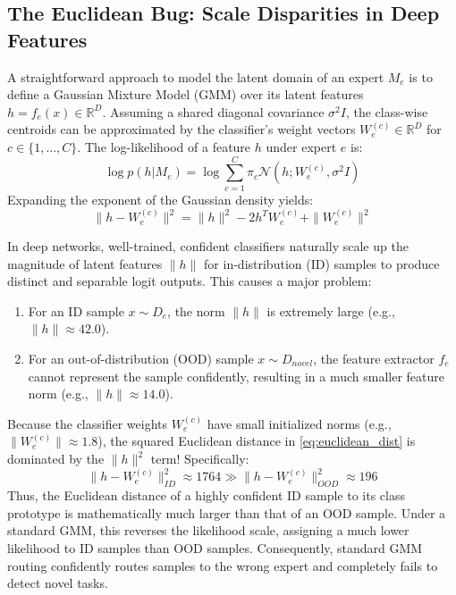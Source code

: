 \documentclass{article}
\theoremstyle{plain}
\theoremstyle{definition}
\theoremstyle{remark}
\begin{document}
\subsection{The Euclidean Bug: Scale Disparities in Deep Features}
\label{sec:bug}

A straightforward approach to model the latent domain of an expert $M_e$ is to define a Gaussian Mixture Model (GMM) over its latent features $h = f_e(x) \in \mathbb{R}^D$. Assuming a shared diagonal covariance $\sigma^2 I$, the class-wise centroids can be approximated by the classifier's weight vectors $W_e^{(c)} \in \mathbb{R}^D$ for $c \in \{1, \dots, C\}$. The log-likelihood of a feature $h$ under expert $e$ is:
\begin{equation}
\log p(h | M_e) = \log \sum_{c=1}^C \pi_c \mathcal{N}(h; W_e^{(c)}, \sigma^2 I)
\end{equation}
Expanding the exponent of the Gaussian density yields:
\begin{equation}
\label{eq:euclidean_dist}
\|h - W_e^{(c)}\|^2 = \|h\|^2 - 2 h^T W_e^{(c)} + \|W_e^{(c)}\|^2
\end{equation}

In deep networks, well-trained, confident classifiers naturally scale up the magnitude of latent features $\|h\|$ for in-distribution (ID) samples to produce distinct and separable logit outputs. This causes a major problem:
\begin{enumerate}
\item For an ID sample $x \sim D_e$, the norm $\|h\|$ is extremely large (e.g., $\|h\| \approx 42.0$).
\item For an out-of-distribution (OOD) sample $x \sim D_{novel}$, the feature extractor $f_e$ cannot represent the sample confidently, resulting in a much smaller feature norm (e.g., $\|h\| \approx 14.0$).
\end{enumerate}
Because the classifier weights $W_e^{(c)}$ have small initialized norms (e.g., $\|W_e^{(c)}\| \approx 1.8$), the squared Euclidean distance in \cref{eq:euclidean_dist} is dominated by the $\|h\|^2$ term! Specifically:
\begin{equation}
\|h - W_e^{(c)}\|_{ID}^2 \approx 1764 \gg \|h - W_e^{(c)}\|_{OOD}^2 \approx 196
\end{equation}
Thus, the Euclidean distance of a highly confident ID sample to its class prototype is mathematically much larger than that of an OOD sample. Under a standard GMM, this reverses the likelihood scale, assigning a much lower likelihood to ID samples than OOD samples. Consequently, standard GMM routing confidently routes samples to the wrong expert and completely fails to detect novel tasks.
\end{document}
